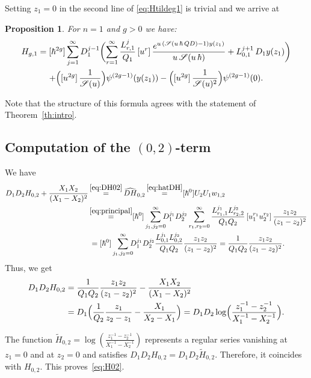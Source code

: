 \documentclass[JEP,XML,SOM,Unicode,NoEqCountersInSection,NoFloatCountersInSection]{cedram}
\let\mathcal\mathscr
\theoremstyle{plain}
\newtheorem{proposition}[theorem]{Proposition}
\theoremstyle{definition}
\theoremstyle{remark}
\newcommand{\cS}{\mathcal{S}}
\begin{document}
Setting $z_1=0$ in the second line of \eqref{eq:Htildeg1} is trivial and we arrive at
\begin{proposition} For $n=1$ and $g>0$ we have:\vspace*{-3pt}
\begin{multline} \label{eq:(g,1)}
H_{g,1} =[\hbar^{2g}]\sum_{j=1}^\infty D_1^{j-1}\biggl(\sum_{r=1}^\infty\frac{L_{r,1}^j}{Q_1}
\,[u^r]\, \frac{e^{u\,(\cS(u\,\hbar\,Q D)-1)y(z_1)}}{u\,\cS(u\,\hbar)}+L_{0,1}^{j+1}\, D_1y(z_1)\biggr)
\\
+\Bigl([u^{2g}]\,\frac1{\cS(u)}\Bigr) \psi^{(2g-1)}(y(z_1))
-\Bigl([u^{2g}]\,\frac1{\cS(u)^2}\Bigr) \psi^{(2g-1)}(0).
\end{multline}
\end{proposition}

Note that the structure of this formula agrees with the statement of Theorem~\ref{th:intro}.

\subsection{Computation of the \texorpdfstring{$(0,2)$}{(0,2)}-term}

We have\vspace*{-3pt}
\begin{align*}
D_1D_2H_{0,2}+\frac{X_1X_2}{(X_1-X_2)^2}& \mathop{=}^{\eqref{eq:DH02}}\widehat{DH}_{0,2}
\mathop{=}^{\eqref{eq:hatDH}}[\hbar^0]U_2U_1w_{1,2}\\
&\mathop{=}^{\eqref{eq:principal}}
[\hbar^0]\sum_{j_1,j_2=0}^\infty \hspace*{-2mm}D_1^{j_1}D_2^{j_2}\sum_{r_1,r_2=0}^\infty
\frac{L_{r_1,1}^{j_1}L_{r_2,2}^{j_2}}{Q_1Q_2}
\,[u_1^{r_1}u_2^{r_2}]\,\frac{z_1z_2}{(z_1-z_2)^2}\\
&\,=[\hbar^0]\sum_{j_1,j_2=0}^\infty\hspace*{-2mm} D_1^{j_1}D_2^{j_2}
\frac{L_{0,1}^{j_1}L_{0,2}^{j_2}}{Q_1Q_2}
\frac{z_1z_2}{(z_1-z_2)^2}=\frac{1}{Q_1Q_2}\frac{z_1z_2}{(z_1-z_2)^2}.
\end{align*}
Thus, we get\vspace*{-3pt}
\begin{align*}
D_1D_2H_{0,2}&=\frac{1}{Q_1Q_2}\frac{z_1z_2}{(z_1-z_2)^2}-\frac{X_1X_2}{(X_1-X_2)^2}\\
&=D_1\Bigl(\frac{1}{Q_2}\frac{z_1}{z_2-z_1}-\frac{X_1}{X_2-X_1}\Bigr)=D_1D_2\log\Bigl(\frac {z_1^{-1}-z_2^{-1}}{X_1^{-1}-X_2^{-1}}\Bigr).
\end{align*}

The function $\widetilde H_{0,2}=\log\left(\frac {z_1^{-1}-z_2^{-1}}{X_1^{-1}-X_2^{-1}}\right)$ represents a regular series vanishing at $z_1=0$ and at $z_2=0$ and satisfies $D_1D_2H_{0,2}=D_1D_2\widetilde H_{0,2}$. Therefore, it coincides with $H_{0,2}$. This proves~\eqref{eq:H02}.
\end{document}
